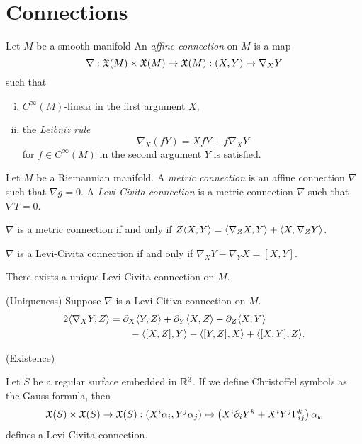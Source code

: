 \documentclass{../../large}
\renewcommand{\a}{\alpha}
\begin{document}
\section{Connections}

\begin{prb}
Let $M$ be a smooth manifold
An \emph{affine connection} on $M$ is a map
\[\nabla:\mathfrak{X}(M)\times\mathfrak{X}(M)\to\mathfrak{X}(M):(X,Y)\mapsto\nabla_XY\]
such that
\begin{enumerate}[(i)]
\item $C^\infty(M)$-linear in the first argument $X$,
\item the \emph{Leibniz rule}
\[\nabla_X(fY)=XfY+f\nabla_XY\]
for $f\in C^\infty(M)$ in the second argument $Y$ is satisfied.
\end{enumerate}
\end{prb}

\begin{prb}
Let $M$ be a Riemannian manifold.
A \emph{metric connection} is an affine connection $\nabla$ such that $\nabla g=0$.
A \emph{Levi-Civita connection} is a metric connection $\nabla$ such that $\nabla T=0$.
\begin{parts}
\item $\nabla$ is a metric connection if and only if $Z\langle X,Y\rangle=\langle\nabla_ZX,Y\rangle+\langle X,\nabla_ZY\rangle$.
\item $\nabla$ is a Levi-Civita connection if and only if $\nabla_XY-\nabla_YX=[X,Y]$.
\item There exists a unique Levi-Civita connection on $M$.
\end{parts}
\end{prb}
\begin{pf}
(Uniqueness)
Suppose $\nabla$ is a Levi-Citiva connection on $M$.
\begin{align*}
2\<\nabla_XY,Z\>&=\pd_X\<Y,Z\>+\pd_Y\<X,Z\>-\pd_Z\<X,Y\>\\
&\qquad-\<[X,Z],Y\>-\<[Y,Z],X\>+\<[X,Y],Z\>.
\end{align*}

(Existence)
\end{pf}

\begin{prb}
Let $S$ be a regular surface embedded in $\mathbb{R}^3$.
If we define Christoffel symbols as the Gauss formula, then
\[\fX(S)\times\fX(S)\to\fX(S):(X^i\a_i,Y^j\a_j)\mapsto\left(X^i\pd_iY^k+X^iY^j\Gamma_{ij}^k\right)\a_k\]
defines a Levi-Civita connection.
\end{prb}
\end{document}
